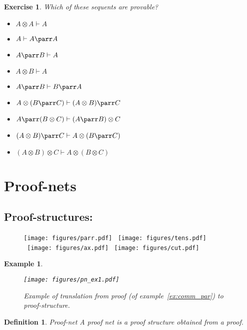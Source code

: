 \documentclass[a4paper,10pt]{article}
\newtheorem{definition}{Definition}
\newtheorem{ex}{Example}
\newtheorem{exo}{Exercise}
\begin{document}
\begin{exo}
	Which of these sequents are provable?
	
	\begin{multicols}{2}
	\begin{itemize}
		\item $A \otimes A\vdash A$
		\item $A\vdash A\parr A$
		\item $A \parr B\vdash A$
		\item $A\otimes B\vdash A$
		\item $A \parr B\vdash B \parr A$
		\item $A \otimes (B\parr C)\vdash (A\otimes B)\parr C$
		\item $A \parr (B\otimes C)\vdash (A\parr B)\otimes C$
		\item $(A\otimes B)\parr C \vdash A \otimes (B \parr C)$
		\item $(A\otimes B)\otimes C \vdash A \otimes (B \otimes C)$
	\end{itemize}	
	\end{multicols}
\end{exo}

\section{Proof-nets}

\subsection{Proof-structures:}

\begin{figure}[h]
\begin{center}
	\texttt{[image: figures/parr.pdf]} \ 
	\texttt{[image: figures/tens.pdf]} \ 
	\texttt{[image: figures/ax.pdf]} \ 
	\texttt{[image: figures/cut.pdf]} \ 
\end{center}
\end{figure}

\begin{ex}
	\begin{figure}[h]
	\begin{center}
		\texttt{[image: figures/pn\_ex1.pdf]}
		\caption{Example of translation from proof (of example~\ref{ex:comm_par}) to proof-structure.}
	\end{center}
	\end{figure}
\end{ex}

\begin{definition}{Proof-net}
	A proof net is a proof structure obtained from a proof.
\end{definition}
\end{document}
